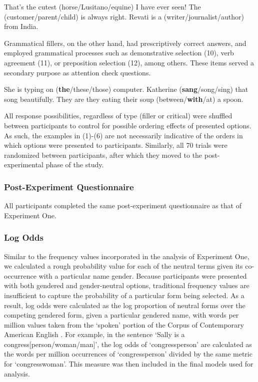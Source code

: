 \documentclass[10pt,letterpaper]{article}
\begin{document}
	\begin{exe}
		\ex That's the cutest (horse/Lusitano/equine) I have ever seen!
		\ex The (customer/parent/child) is always right.
		\ex Revati is a (writer/journalist/author) from India.
	\end{exe}
	
	Grammatical fillers, on the other hand, had prescriptively correct answers, and employed grammatical processes such as demonstrative selection (10), verb agreement (11), or preposition selection (12), among others. These items served a secondary purpose as attention check questions.
	
	\begin{exe}
		\ex She is typing on (\textbf{the}/these/those) computer.
		\ex Katherine (\textbf{sang}/song/sing) that song beautifully. 
		\ex They are they eating their soup (between/\textbf{with}/at) a spoon.
	\end{exe}
	
	All response possibilities, regardless of type (filler or critical) were shuffled between participants to control for possible ordering effects of presented options. As such, the examples in (1)-(6) are not necessarily indicative of the orders in which options were presented to participants. Similarly, all 70 trials were randomized between participants, after which they moved to the post-experimental phase of the study. 
	
	\subsubsection{Post-Experiment Questionnaire}
	All participants completed the same post-experiment questionnaire as that of Experiment One. 
	
	\subsubsection{Log Odds} 
	Similar to the frequency values incorporated in the analysis of Experiment One, we calculated a rough probability value for each of the neutral terms given its co-occurrence with a particular name gender. Because participants were presented with both gendered and gender-neutral options, traditional frequency values are insufficient to capture the probability of a particular form being selected. As a result, log odds were calculated as the log proportion of neutral forms over the competing gendered form, given a particular gendered name, with words per million values taken from the `spoken' portion of the Corpus of Contemporary American English \parencite{coca}. For example, in the sentence `Sally is a congress[person/woman/man]', the log odds of `congressperson' are calculated as the words per million occurrences of `congressperson' divided by the same metric for `congresswoman'. This measure was then included in the final models used for analysis.
	
\end{document}
